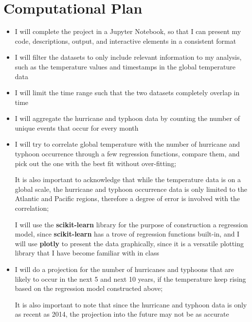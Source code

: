 \documentclass[fontsize=11pt]{article}
\begin{document}
\section*{Computational Plan}
\begin{itemize}
    \item I will complete the project in a Jupyter Notebook, so that I can present my code, descriptions, output, and interactive elements in a consistent format

    \item I will filter the datasets to only include relevant information to my analysis, such as the temperature values and timestamps in the global temperature data

    \item I will limit the time range such that the two datasets completely overlap in time


    \item I will aggregate the hurricane and typhoon data by counting the number of unique events that occur for every month

    \item I will try to correlate global temperature with the number of hurricane and typhoon occurrence through a few regression functions, compare them, and pick out the one with the best fit without over-fitting;

    It is also important to acknowledge that while the temperature data is on a global scale, the hurricane and typhoon occurrence data is only limited to the Atlantic and Pacific regions, therefore a degree of error is involved with the correlation;

    I will use the \textbf{scikit-learn} library for the purpose of construction a regression model, since \textbf{scikit-learn} has a trove of regression functions built-in, and I will use \textbf{plotly} to present the data graphically, since it is a versatile plotting library that I have become familiar with in class

    \item I will do a projection for the number of hurricanes and typhoons that are likely to occur in the next 5 and next 10 years, if the temperature keep rising based on the regression model constructed above;

    It is also important to note that since the hurricane and typhoon data is only as recent as 2014, the projection into the future may not be as accurate


\end{itemize}
\end{document}
